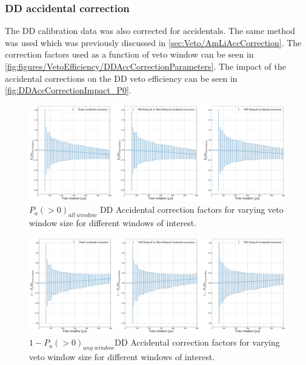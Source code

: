 \subsubsection{DD accidental correction}
The DD calibration data was also corrected for accidentals. The same method was used which was previously discussed in \autoref{sec:Veto/AmLiAccCorrection}. The correction factors used as a function of veto window can be seen in \autoref{fig:figures/VetoEfficiency/DDAccCorrectionParameters}.
The impact of the accidental corrections on the DD veto efficiency can be seen in \autoref{fig:DDAccCorrectionImpact_P0}.

\begin{figure}
	\centering
	\includegraphics[width=\textwidth]{figures/VetoEfficiency/DDAccCorrectionImpact_P0.pdf}
	\caption{$P_a(>0)_{all\:window}$ DD Accidental correction factors for varying veto window size for different windows of interest.}
	\label{fig:DDAccCorrectionImpact_P0}
\end{figure}

\begin{figure}
	\centering
	\includegraphics[width=\textwidth]{figures/VetoEfficiency/DDAccCorrectionImpact_1-P0.pdf}
	\caption{$1-P_a(>0)_{any\:window}$DD Accidental correction factors for varying veto window size for different windows of interest.}
	\label{fig:figures/VetoEfficiency/DDAccCorrectionImpact_1-P0}
\end{figure}

